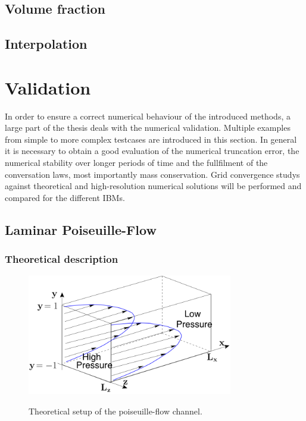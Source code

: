 \subsection{Volume fraction}
\subsection{Interpolation}
\newpage

\section{Validation}

In order to ensure a correct numerical behaviour of the introduced methods,
a large part of the thesis deals with the numerical validation.
Multiple examples from simple to more complex testcases are introduced in this section.
In general it is necessary to obtain a good evaluation of the numerical truncation error, the numerical stability over longer periods of time
and the fullfilment of the conversation laws, most importantly mass conservation.
Grid convergence studys against theoretical and high-resolution numerical solutions  will be performed
and compared for the different IBMs.


\subsection{Laminar Poiseuille-Flow}
\subsubsection{Theoretical description}

\begin{figure}[!bp]
  \centering
  \includegraphics[width=0.8\textwidth]{gfx/immersed_boundary/val_volpen/poiseuilleflow.png}\label{b}
  \caption{Theoretical setup of the poiseuille-flow channel.}
\end{figure}

